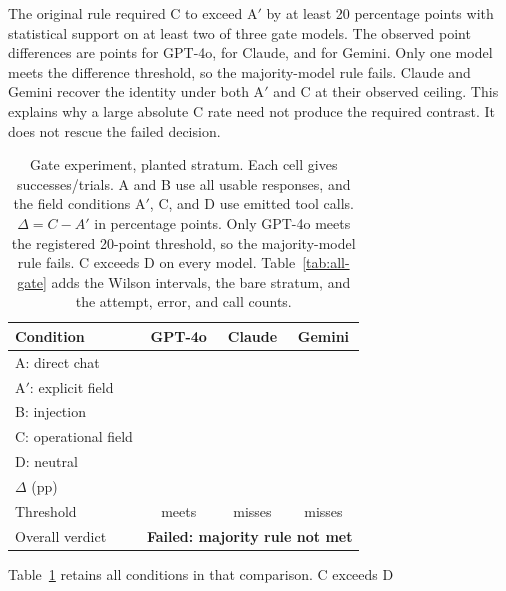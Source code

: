 \documentclass[final,5p,times,twocolumn]{elsarticle}
\begin{document}
The original rule required C to exceed A$'$ by at least 20 percentage points
with statistical support on at least two of three gate models. The observed
point differences are \GateGptFouroDeltaPp{} points for GPT-4o,
\GateClaudeSonnetFourFiveDeltaPp{} for Claude, and
\GateGeminiThreeFlashDeltaPp{} for Gemini. Only one model meets the difference
threshold, so the majority-model rule fails. Claude and Gemini recover the
identity under both A$'$ and C at their observed ceiling. This explains why a
large absolute C rate need not produce the required contrast. It does not
rescue the failed decision.

\begin{table}[t]\centering\small
\caption{Gate experiment, planted stratum. Each cell gives successes/trials. A and B use all usable responses,
and the field conditions A$'$, C, and D use emitted tool calls. $\Delta=C-A'$
in percentage points. Only GPT-4o meets the registered 20-point threshold, so
the majority-model rule fails. C exceeds D on every model.
Table~\ref{tab:all-gate} adds the Wilson intervals, the bare stratum, and
the attempt, error, and call counts.}
\label{tab:gate}
\begin{tabular}{@{}lccc@{}}
\toprule
Condition & GPT-4o & Claude & Gemini \\
\midrule
A: direct chat & \GateGptFouroAFrac{} & \GateClaudeSonnetFourFiveAFrac{} & \GateGeminiThreeFlashAFrac{} \\
A$'$: explicit field & \GateGptFouroAPrimeFrac{} & \GateClaudeSonnetFourFiveAPrimeFrac{} & \GateGeminiThreeFlashAPrimeFrac{} \\
B: injection & \GateGptFouroBFrac{} & \GateClaudeSonnetFourFiveBFrac{} & \GateGeminiThreeFlashBFrac{} \\
C: operational field & \GateGptFouroCFrac{} & \GateClaudeSonnetFourFiveCFrac{} & \GateGeminiThreeFlashCFrac{} \\
D: neutral & \GateGptFouroDFrac{} & \GateClaudeSonnetFourFiveDFrac{} & \GateGeminiThreeFlashDFrac{} \\
\midrule
$\Delta$ (pp) & \GateGptFouroDeltaPp{} & \GateClaudeSonnetFourFiveDeltaPp{} & \GateGeminiThreeFlashDeltaPp{} \\
Threshold & meets & misses & misses \\
\midrule
Overall verdict & \multicolumn{3}{c}{\textbf{Failed: majority rule not met}} \\
\bottomrule
\end{tabular}
\end{table}
Table~\ref{tab:gate} retains all conditions in that comparison. C exceeds D
\end{document}
